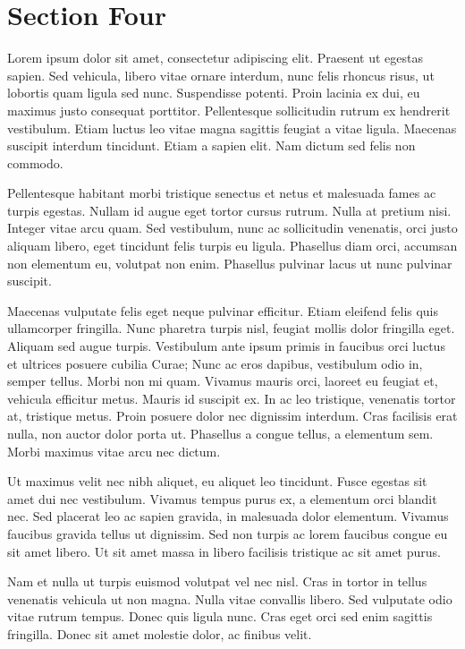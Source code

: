 \documentclass[runningheads,a4paper]{llncs}
\begin{document}
\section{Section Four}
%
Lorem ipsum dolor sit amet, consectetur adipiscing elit. Praesent ut egestas sapien. Sed vehicula, libero vitae ornare interdum, nunc felis rhoncus risus, ut lobortis quam ligula sed nunc. Suspendisse potenti. Proin lacinia ex dui, eu maximus justo consequat porttitor. Pellentesque sollicitudin rutrum ex hendrerit vestibulum. Etiam luctus leo vitae magna sagittis feugiat a vitae ligula. Maecenas suscipit interdum tincidunt. Etiam a sapien elit. Nam dictum sed felis non commodo.

Pellentesque habitant morbi tristique senectus et netus et malesuada fames ac turpis egestas. Nullam id augue eget tortor cursus rutrum. Nulla at pretium nisi. Integer vitae arcu quam. Sed vestibulum, nunc ac sollicitudin venenatis, orci justo aliquam libero, eget tincidunt felis turpis eu ligula. Phasellus diam orci, accumsan non elementum eu, volutpat non enim. Phasellus pulvinar lacus ut nunc pulvinar suscipit.

Maecenas vulputate felis eget neque pulvinar efficitur. Etiam eleifend felis quis ullamcorper fringilla. Nunc pharetra turpis nisl, feugiat mollis dolor fringilla eget. Aliquam sed augue turpis. Vestibulum ante ipsum primis in faucibus orci luctus et ultrices posuere cubilia Curae; Nunc ac eros dapibus, vestibulum odio in, semper tellus. Morbi non mi quam. Vivamus mauris orci, laoreet eu feugiat et, vehicula efficitur metus. Mauris id suscipit ex. In ac leo tristique, venenatis tortor at, tristique metus. Proin posuere dolor nec dignissim interdum. Cras facilisis erat nulla, non auctor dolor porta ut. Phasellus a congue tellus, a elementum sem. Morbi maximus vitae arcu nec dictum.

Ut maximus velit nec nibh aliquet, eu aliquet leo tincidunt. Fusce egestas sit amet dui nec vestibulum. Vivamus tempus purus ex, a elementum orci blandit nec. Sed placerat leo ac sapien gravida, in malesuada dolor elementum. Vivamus faucibus gravida tellus ut dignissim. Sed non turpis ac lorem faucibus congue eu sit amet libero. Ut sit amet massa in libero facilisis tristique ac sit amet purus.

Nam et nulla ut turpis euismod volutpat vel nec nisl. Cras in tortor in tellus venenatis vehicula ut non magna. Nulla vitae convallis libero. Sed vulputate odio vitae rutrum tempus. Donec quis ligula nunc. Cras eget orci sed enim sagittis fringilla. Donec sit amet molestie dolor, ac finibus velit.
%
\newpage
%
\end{document}
